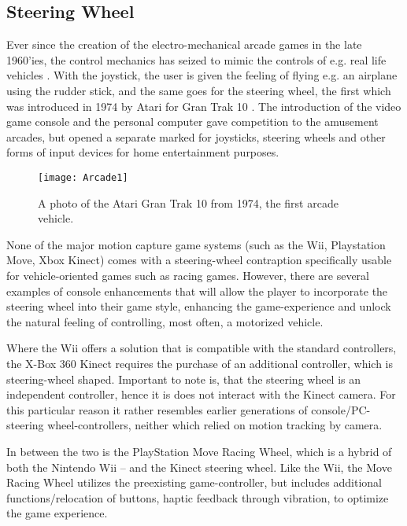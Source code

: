 \subsection{Steering Wheel}
Ever since the creation of the electro-mechanical arcade games in the late 1960’ies, the control mechanics has seized to mimic the controls of e.g. real life vehicles \parencite{Herz1997}. With the joystick, the user is given the feeling of flying e.g. an airplane using the rudder stick, and the same goes for the steering wheel, the first which was introduced in 1974 by Atari for Gran Trak 10 \parencite{Kohler2005}. The introduction of the video game console and the personal computer gave competition to the amusement arcades, but opened a separate marked for joysticks, steering wheels and other forms of input devices for home entertainment purposes. 

\begin{figure}[h] 
\centering
\texttt{[image: Arcade1]} 
\caption{A photo of the Atari Gran Trak 10 from 1974, the first arcade vehicle. }
\label{fig:Arcade}
\end{figure}
\bigskip

None of the major motion capture game systems (such as the Wii, Playstation Move, Xbox Kinect) comes with a steering-wheel contraption specifically usable for vehicle-oriented games such as racing games. However, there are several examples of console enhancements that will allow the player to incorporate the steering wheel into their game style, enhancing the game-experience and unlock the natural feeling of controlling, most often, a motorized vehicle.
\bigskip

Where the Wii offers a solution that is compatible with the standard controllers, the X-Box 360 Kinect requires the purchase of an additional controller, which is steering-wheel shaped. Important to note is, that the steering wheel is an independent controller, hence it is does not interact with the Kinect camera. For this particular reason it rather resembles earlier generations of console/PC-steering wheel-controllers, neither which relied on motion tracking by camera.
\bigskip

In between the two is the PlayStation Move Racing Wheel, which is a hybrid of both the Nintendo Wii – and the Kinect steering wheel. Like the Wii, the Move Racing Wheel utilizes the preexisting game-controller, but includes additional functions/relocation of buttons, haptic feedback through vibration, to optimize the game experience.

